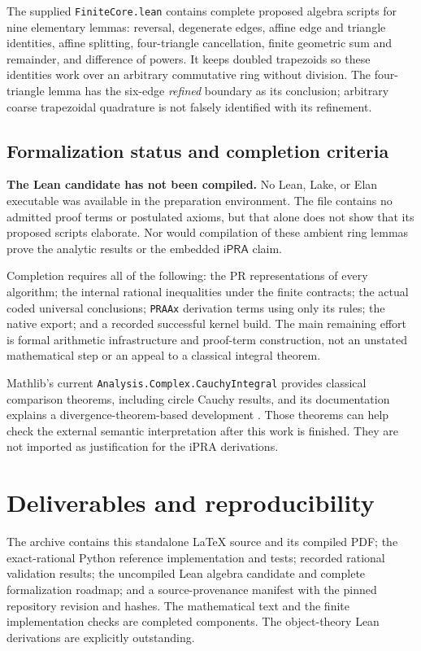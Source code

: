 \documentclass[11pt]{article}
\theoremstyle{definition}
\newcommand{\ipra}{\mathsf{iPRA}}
\newcommand{\code}[1]{\texttt{#1}}
\begin{document}
The supplied \code{FiniteCore.lean} contains complete proposed algebra
scripts for nine elementary lemmas: reversal, degenerate edges, affine
edge and triangle identities, affine splitting, four-triangle
cancellation, finite geometric sum and remainder, and difference of
powers. It keeps doubled trapezoids so these identities work over an
arbitrary commutative ring without division. The four-triangle lemma
has the six-edge \emph{refined} boundary as its conclusion; arbitrary
coarse trapezoidal quadrature is not falsely identified with its
refinement.

\subsection{Formalization status and completion criteria}

\textbf{The Lean candidate has not been compiled.} No Lean, Lake, or
Elan executable was available in the preparation environment. The file
contains no admitted proof terms or postulated axioms, but that alone
does not show that its proposed scripts elaborate. Nor would compilation
of these ambient ring lemmas prove the analytic results or the embedded
\(\ipra\) claim.

Completion requires all of the following: the PR representations of
every algorithm; the internal rational inequalities under the finite
contracts; the actual coded universal conclusions; \code{PRAAx}
derivation terms using only its rules; the native export; and a recorded
successful kernel build. The main remaining effort is formal arithmetic
infrastructure and proof-term construction, not an unstated mathematical
step or an appeal to a classical integral theorem.

Mathlib's current \code{Analysis.Complex.CauchyIntegral} provides
classical comparison theorems, including circle Cauchy results, and its
documentation explains a divergence-theorem-based development
\cite{mathlibcauchy}. Those theorems can help check the external semantic
interpretation after this work is finished. They are not imported as
justification for the iPRA derivations.

\section{Deliverables and reproducibility}\label{sec:repro}

The archive contains this standalone \LaTeX{} source and its compiled
PDF; the exact-rational Python reference implementation and tests;
recorded rational validation results; the uncompiled Lean algebra
candidate and complete formalization roadmap; and a source-provenance
manifest with the pinned repository revision and hashes.
The mathematical text and the finite implementation checks are completed
components. The object-theory Lean derivations are explicitly outstanding.
\end{document}
